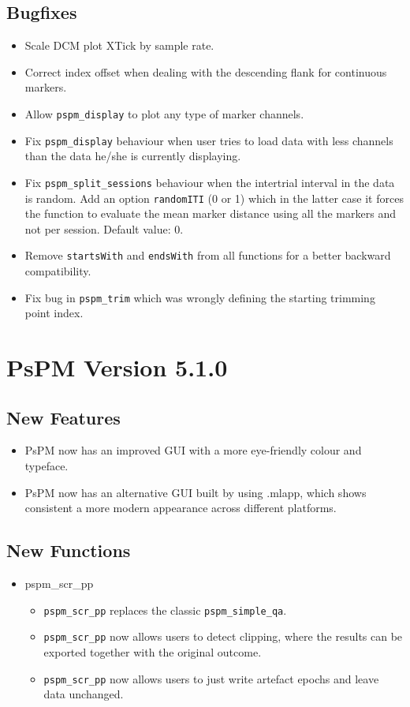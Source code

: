 \documentclass[english]{article}
\numberwithin{equation}{section}
\numberwithin{figure}{section}
\begin{document}
\subsection*{Bugfixes}
\begin{itemize}
\item Scale DCM plot XTick by sample rate.
\item Correct index offset when dealing with the descending flank for continuous
markers.
\item Allow \texttt{pspm\_display} to plot any type of marker channels.
\item Fix \texttt{pspm\_display} behaviour when user tries to load data
with less channels than the data he/she is currently displaying.
\item Fix \texttt{pspm\_split\_sessions} behaviour when the intertrial interval
in the data is random. Add an option \texttt{randomITI} (0 or 1) which
in the latter case it forces the function to evaluate the mean marker
distance using all the markers and not per session. Default value:
0.
\item Remove \texttt{startsWith} and \texttt{endsWith} from all functions
for a better backward compatibility.
\item Fix bug in \texttt{pspm\_trim} which was wrongly defining the starting
trimming point index.
\end{itemize}

\section{PsPM Version 5.1.0}

\subsection*{New Features}
\begin{itemize}
\item PsPM now has an improved GUI with a more eye-friendly colour and typeface.
\item PsPM now has an alternative GUI built by using .mlapp, which shows
consistent a more modern appearance across different platforms.
\end{itemize}

\subsection*{New Functions}
\begin{itemize}
\item pspm\_scr\_pp
\begin{itemize}
\item \texttt{pspm\_scr\_pp} replaces the classic \texttt{pspm\_simple\_qa}.
\item \texttt{pspm\_scr\_pp} now allows users to detect clipping, where
the results can be exported together with the original outcome.
\item \texttt{pspm\_scr\_pp} now allows users to just write artefact epochs
and leave data unchanged.
\end{itemize}
\end{itemize}
\end{document}
